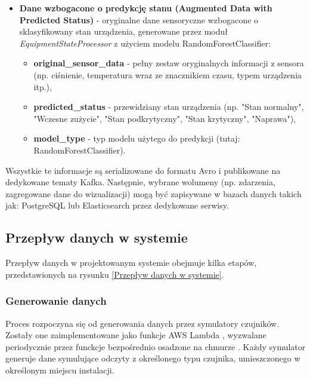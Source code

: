 \begin{itemize}
    \item \textbf{Dane wzbogacone o predykcję stanu (Augmented Data with Predicted Status)} - oryginalne dane sensoryczne wzbogacone o sklasyfikowany stan urządzenia, generowane przez moduł \textit{\mbox{EquipmentStateProcessor}} z użyciem modelu \mbox{RandomForestClassifier}:
    \begin{itemize}
        \item \textbf{original\_sensor\_data} - pełny zestaw oryginalnych informacji z sensora (np. ciśnienie, temperatura wraz ze znacznikiem czasu, typem urządzenia itp.),
        \item \textbf{predicted\_status} - przewidziany stan urządzenia (np. "Stan normalny", "Wczesne zużycie", "Stan podkrytyczny", "Stan krytyczny", "Naprawa"),
        \item \textbf{model\_type} - typ modelu użytego do predykcji (tutaj: \mbox{RandomForestClassifier}).
    \end{itemize}
\end{itemize}

\vspace{0.3em}

Wszystkie te informacje są serializowane do formatu Avro i publikowane na dedykowane tematy Kafka. Następnie, wybrane wolumeny (np. zdarzenia, zagregowane dane do wizualizacji) mogą być zapisywane w bazach danych takich jak: PostgreSQL lub Elasticsearch przez dedykowane serwisy.

\newpage

\subsection{Przepływ danych w systemie}
\label{subsec:przeplyw_danych}

Przepływ danych w projektowanym systemie obejmuje kilka etapów, przedstawionych na rysunku \ref{Przepływ danych w systemie}.


\subsubsection{Generowanie danych}
\label{subsubsec:generowanie_danych}

Proces rozpoczyna się od generowania danych przez symulatory czujników. Zostały one zaimplementowane jako funkcje AWS Lambda \cite{aws_lambda_docs},
wyzwalane periodycznie przez funckcje bezpośrednio osadzone na chmurze  \cite{aws_step_functions_docs}.
Każdy symulator generuje dane symulujące odczyty z określonego typu czujnika,
umieszczonego w określonym miejscu instalacji.

